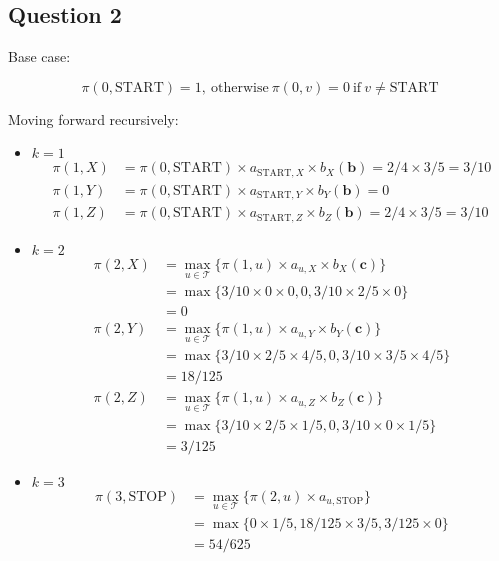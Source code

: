 \documentclass[11pt,fancychapters]{article}
\begin{document}
\subsection*{Question 2}

Base case:

\begin{equation*}
	\pi(0, \text{START}) = 1, ~ \text{otherwise} ~ \pi(0, v) = 0 ~ \text{if} ~ v \neq \text{START}
\end{equation*}

Moving forward recursively:

\begin{itemize}
	\item[] $k = 1$
	\begin{align*}
		\pi(1, X) &= \pi(0, \text{START}) \times a_{\text{START}, X} \times b_X(\textbf{b}) = 2/4 \times 3/5 = 3/10 \\
		\pi(1, Y) &= \pi(0, \text{START}) \times a_{\text{START}, Y} \times b_Y(\textbf{b}) = 0 \\
		\pi(1, Z) &= \pi(0, \text{START}) \times a_{\text{START}, Z} \times b_Z(\textbf{b}) = 2/4 \times 3/5 = 3/10
	\end{align*}
	
	\item[] $k = 2$
	\begin{align*}
		\pi(2, X) &= \max_{u \in \mathcal{T}} \{ \pi(1, u) \times a_{u, X} \times b_X(\textbf{c}) \} \\
		&= \max \{ 3/10 \times 0 \times 0, 0, 3/10 \times 2/5 \times 0 \} \\
		&= 0 \\
		\pi(2, Y) &= \max_{u \in \mathcal{T}} \{ \pi(1, u) \times a_{u, Y} \times b_Y(\textbf{c}) \} \\
		&= \max \{ 3/10 \times 2/5 \times 4/5, 0, 3/10 \times 3/5 \times 4/5 \} \\
		&= 18/125 \\
		\pi(2, Z) &= \max_{u \in \mathcal{T}} \{ \pi(1, u) \times a_{u, Z} \times b_Z(\textbf{c}) \} \\
		&= \max \{ 3/10 \times 2/5 \times 1/5, 0, 3/10 \times 0 \times 1/5 \} \\
		&= 3/125
	\end{align*}

	\item[] $k = 3$
	\begin{align*}
		\pi(3, \text{STOP}) &= \max_{u \in \mathcal{T}} \{ \pi(2, u) \times a_{u, \text{STOP}} \} \\
		&= \max \{ 0 \times 1/5, 18/125 \times 3/5, 3/125 \times 0 \} \\
		&= 54/625
	\end{align*}
\end{itemize}
\end{document}
